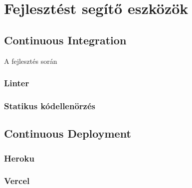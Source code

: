 
\chapter{Fejlesztést segítő eszközök}
\section{Continuous Integration}
A fejlesztés során 

\subsection{Linter}

\subsection{Statikus kódellenörzés}

\section{Continuous Deployment}

\subsection{Heroku}

\subsection{Vercel}
